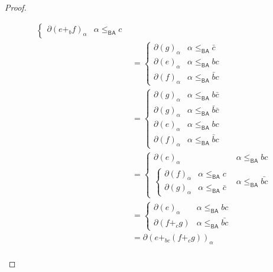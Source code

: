 \documentclass[a4paper,UKenglish,cleveref, autoref, thm-restate]{lipics-v2021}
\newcommand{\BA}{\textsf{BA}}
\theoremstyle{plain}\newtheoremrep{thm}{Theorem}[section]
\begin{document}
\begin{toappendix}
\begin{proof}
\begin{enumerate}
\begin{align*}
\begin{cases}
						\partial(e+_b f)_\alpha & \alpha \leq_{\BA} c
					\end{cases}\\
					&=\begin{cases}
						\partial(g)_\alpha & \alpha \leq_{\BA} \bar c\\
						\partial(e)_\alpha & \alpha \leq_{\BA} bc\\
						\partial(f)_\alpha & \alpha \leq_{\BA} \bar{b}c
					\end{cases}\\
					&=\begin{cases}
						\partial(g)_\alpha & \alpha \leq_{\BA} b\bar c\\
						\partial(g)_\alpha & \alpha \leq_{\BA} \bar b\bar c\\
						\partial(e)_\alpha & \alpha \leq_{\BA} bc\\
						\partial(f)_\alpha & \alpha \leq_{\BA} \bar{b}c
					\end{cases}\\
					&=\begin{cases}
						\partial(e)_\alpha & \alpha \leq_{\BA} bc\\
						\begin{cases}
							\partial(f)_\alpha & \alpha \leq_{\BA} c\\
							\partial(g)_\alpha & \alpha \leq_{\BA} \bar c
						\end{cases} & \alpha \leq_{\BA} \bar{bc}
					\end{cases}\\
					&=\begin{cases}
						\partial(e)_\alpha & \alpha \leq_{\BA} bc\\
						\partial(f+_c g) & \alpha \leq_{\BA} \bar{bc}
					\end{cases}\\
					&= \partial(e+_{bc}(f+_cg))_\alpha\\
				\end{align*}
				

\end{enumerate}
\end{proof}
\end{toappendix}
\end{document}
